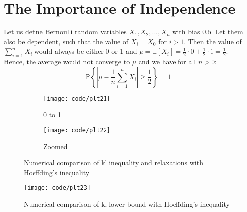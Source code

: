 \documentclass[a4paper]{article}
\begin{document}
\section{The Importance of Independence}
Let us define Bernoulli random variables $X_1, X_2, ..., X_n$ with bias $0.5$.
Let them also be dependent, such that the value of $X_i = X_0$ for $i>1$. Then the value of
$\sum_{i=1}^{n} X_{i}$ would always be either 0 or 1 and
$\mu = \mathbb{E}\left[X_{i}\right] = \frac{1}{2} \cdot 0 + \frac{1}{2} \cdot 1 = \frac{1}{2}$.\\
Hence, the average would not converge to $\mu$ and we have for all $n > 0$:
$$
\mathbb{P}\left\{\left|\mu-\frac{1}{n} \sum_{i=1}^{n} X_{i}\right| \geq \frac{1}{2}\right\}=1
$$

\begin{figure}
  \centering
  \begin{subfigure}[b]{\textwidth}
    \centering
    \texttt{[image: code/plt21]}
    \caption{0 to 1}
  \end{subfigure}
  \begin{subfigure}[b]{\textwidth}
    \centering
    \texttt{[image: code/plt22]}
    \caption{Zoomed}
  \end{subfigure}
  \caption{Numerical comparison of kl inequality and relaxations with Hoeffding’s inequality}
  \label{plt1}
\end{figure}

\begin{figure}
  \centering
  \texttt{[image: code/plt23]}
  \caption{Numerical comparison of kl lower bound with Hoeffding’s inequality}
  \label{plt2}
\end{figure}
\end{document}
